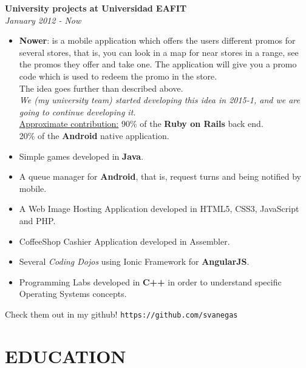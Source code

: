 \documentclass[margin, 10pt]{res} %
\begin{document}
\begin{resume}
\textbf{University projects at Universidad EAFIT} \\
\textit{January 2012 - Now} \\
\begin{itemize}
  \item \textbf{Nower}: is a mobile application which offers the users different promos for several
        stores, that is, you can look in a map for near stores in a range, see the promos they offer
        and take one. The application will give you a promo code which is used to redeem the promo
        in the store.\\
        The idea goes further than described above.\\
        \emph{We (my university team) started developing this idea in 2015-1, and we are going to
              continue developing it.}\\
        \underline{Approximate contribution:} 90\% of the \textbf{Ruby on Rails} back end. \\
                                              20\% of the \textbf{Android} native application.
  \item Simple games developed in \textbf{Java}.
  \item A queue manager for \textbf{Android}, that is, request turns and being notified by mobile.
  \item A Web Image Hosting Application developed in HTML5, CSS3, JavaScript and PHP.
  \item CoffeeShop Cashier Application developed in Assembler.
  \item Several \textit{Coding Dojos} using Ionic Framework for \textbf{AngularJS}.
  \item Programming Labs developed in \textbf{C++} in order to understand specific Operating Systems
        concepts.
\end{itemize}
Check them out in my github! \texttt{https://github.com/svanegas}


\section{EDUCATION}


\end{resume}
\end{document}
